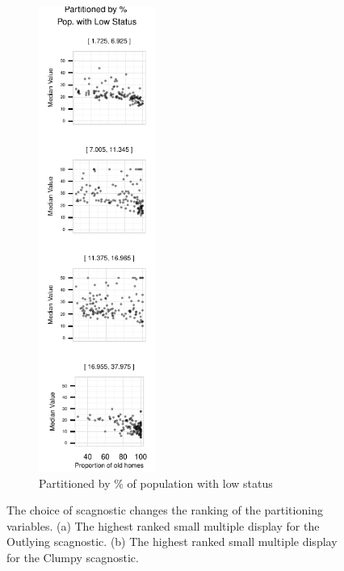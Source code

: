 \begin{figure}[t]
\begin{subfigure}[b]{1.5in}
		\includegraphics[width=1.5in]{images/LSTAT.pdf}
		  \caption{Partitioned by \% of population with low status}
		 \label{fig:bostonOutlying}
	 \end{subfigure}
	  \caption{The choice of scagnostic changes the ranking of the partitioning variables. (a) The highest  ranked small multiple display for the Outlying scagnostic. (b) The highest ranked small multiple display for the Clumpy scagnostic.}
\end{figure}


